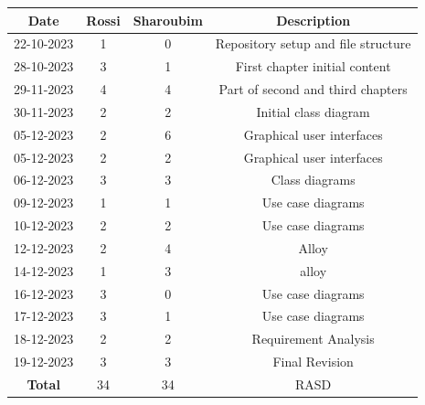 \documentclass[12pt, a4paper]{report}
\begin{document}
    \begin{table}[H]
        \centering
        \begin{tabular}{cccc}
            \textbf{Date}   & \textbf{Rossi}            & \textbf{Sharoubim}            & \textbf{Description}                          \\ \hline
            22-10-2023      & 1                         & 0                             & Repository setup and file structure           \\ 
            28-10-2023      & 3                         & 1                             & First chapter initial content                 \\ 
            29-11-2023      & 4                         & 4                             & Part of second and third chapters             \\
            30-11-2023      & 2                         & 2                             & Initial class diagram                         \\
            05-12-2023      & 2                         & 6                             & Graphical user interfaces                     \\
            05-12-2023      & 2                         & 2                             & Graphical user interfaces                     \\
            06-12-2023      & 3                         & 3                             & Class diagrams                                \\
            09-12-2023      & 1                         & 1                             & Use case diagrams                             \\
            10-12-2023      & 2                         & 2                             & Use case diagrams                             \\
            12-12-2023      & 2                         & 4                             & Alloy                                         \\
            14-12-2023      & 1                         & 3                             & alloy                                         \\
            16-12-2023      & 3                         & 0                             & Use case diagrams                             \\
            17-12-2023      & 3                         & 1                             & Use case diagrams                             \\
            18-12-2023      & 2                         & 2                             & Requirement Analysis                          \\
            19-12-2023      & 3                         & 3                             & Final Revision                                \\ \hline
            \textbf{Total}  & 34                        & 34                            & RASD                                          \\  
        \end{tabular}
    \end{table}
\end{document}
